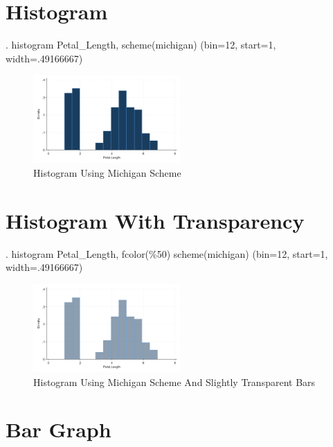 \documentclass[
]{article}
\begin{document}
\section{Histogram}\label{histogram}

\begin{stlog}
. histogram Petal_Length, scheme(michigan)
(bin=12, start=1, width=.49166667)
\end{stlog}



\begin{figure}
\centering
\includegraphics[width=0.5\textwidth,height=\textheight]{myhistogram.png}
\caption{Histogram Using Michigan Scheme}
\end{figure}

\section{Histogram With Transparency}\label{histogram-with-transparency}

\begin{stlog}
. histogram Petal_Length, fcolor(\%50) scheme(michigan)
(bin=12, start=1, width=.49166667)
\end{stlog}



\begin{figure}
\centering
\includegraphics[width=0.5\textwidth,height=\textheight]{myhistogram2.png}
\caption{Histogram Using Michigan Scheme And Slightly Transparent Bars}
\end{figure}

\section{Bar Graph}\label{bar-graph}
\end{document}
